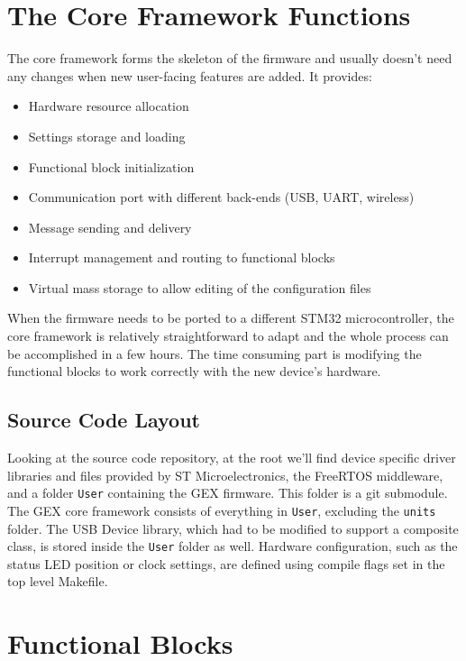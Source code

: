 \section{The Core Framework Functions}

The core framework forms the skeleton of the firmware and usually doesn't need any changes when new user-facing features are added. It provides:

\begin{itemize}
	\item Hardware resource allocation
	\item Settings storage and loading
	\item Functional block initialization
	\item Communication port with different back-ends (USB, UART, wireless)
	\item Message sending and delivery
	\item Interrupt management and routing to functional blocks
	\item Virtual mass storage to allow editing of the configuration files
\end{itemize}

When the firmware needs to be ported to a different STM32 microcontroller, the core framework is relatively straightforward to adapt and the whole process can be accomplished in a few hours. The time consuming part is modifying the functional blocks to work correctly with the new device's hardware. 

\subsection{Source Code Layout}

Looking at the source code repository, at the root we'll find device specific driver libraries and files provided by ST Microelectronics, the FreeRTOS middleware, and a folder \verb|User| containing the GEX firmware. This folder is a git submodule. The GEX core framework consists of everything in \verb|User|, excluding the \verb|units| folder. The USB Device library, which had to be modified to support a composite class, is stored inside the \verb|User| folder as well. Hardware configuration, such as the status LED position or clock settings, are defined using compile flags set in the top level Makefile.

\section{Functional Blocks} \label{sec:units-function}

